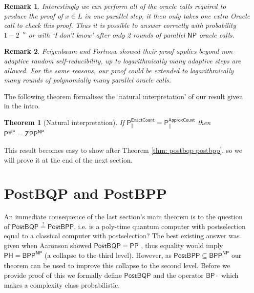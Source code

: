 \documentclass[10pt,a4paper]{article}
\newtheorem{theorem}{Theorem}
\newtheorem*{remark*}{Remark}
\begin{document}
\begin{remark*}
    Interestingly we can perform all of the oracle calls required to produce the proof of $x\in L$ in one parallel step, it then only takes one extra Oracle call to check this proof. Thus it is possible to answer correctly with probability $1-2^{-n}$ or with `I don't know' after only 2 rounds of parallel $\mathsf{NP}$ oracle calls.
\end{remark*}

\begin{remark*}
    Feigenbaum and Fortnow \cite{feigenbaum1990random} showed their proof applies beyond non-adaptive random self-reducibility, up to logarithmically many adaptive steps are allowed. For the same reasons, our proof could be extended to logarithmically many rounds of polynomially many parallel oracle calls.
\end{remark*}

The following theorem formalises the `natural interpretation' of our result given in the intro.

\begin{theorem}[Natural interpretation]\label{thm: natural}
    If $\mathsf{P^{ExactCount}_{\parallel}}=\mathsf{P^{ApproxCount}_{\parallel}}$ then $\mathsf{P^{\#P}=ZPP^{NP}}$
\end{theorem}

This result becomes easy to show after Theorem \ref{thm: postbqp postbpp}, so we will prove it at the end of the next section.



\section{PostBQP and PostBPP}\label{sect: postBQP v postBPP}

An immediate consequence of the last section's main theorem is to the question of $\mathsf{PostBQP\stackrel{?}{=} PostBPP}$, i.e. is a poly-time quantum computer with postselection equal to a classical computer with postselection? The best existing answer was given when Aaronson showed $\mathsf{PostBQP=PP}$ \cite{aaronson2014equivalence}, thus equality would imply $\mathsf{PH=BPP^{NP}}$ (a collapse to the third level). However, as $\mathsf{PostBPP}\subseteq \mathsf{BPP^{NP}_{\parallel}}$ \cite{o2018weakness, han1997threshold} our theorem can be used to improve this collapse to the second level. Before we provide proof of this we formally define $\mathsf{PostBQP}$ and the operator $\mathsf{BP\cdot}$ which makes a complexity class probabilistic.
\end{document}
